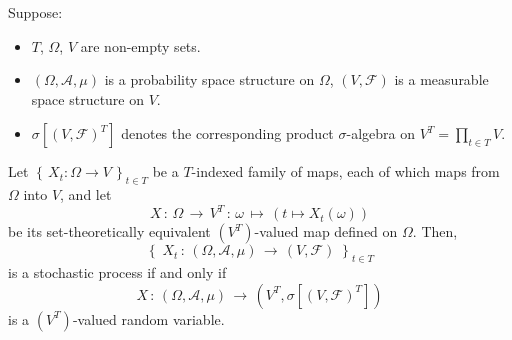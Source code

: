 \begin{corollary}
\mbox{}\vskip 0.1cm
\noindent
Suppose:
\begin{itemize}
\item	$T$, $\Omega$, $V$ are non-empty sets.
\item	$\left(\Omega,\mathcal{A},\mu\right)$ is a probability space structure on $\Omega$,
		$\left(V,\mathcal{F}\right)$ is a measurable space structure on $V$.
\item	$\sigma[(V,\mathcal{F})^{T}]$ denotes the corresponding product $\sigma$-algebra
		on $V^{T} = \prod_{t\in T}V$.
\end{itemize}
Let $\left\{\,X_{t} : \Omega \longrightarrow V \,\right\}_{t \in T}$
be a $T$-indexed family of maps, each of which maps from $\Omega$ into $V$,
and let
\begin{equation*}
X \,:\, \Omega \,\longrightarrow\, V^{T} \,:\, \omega \,\longmapsto\, \left(t \longmapsto X_{t}(\omega)\right)
\end{equation*}
be its set-theoretically equivalent $(V^{T})$-valued map defined on $\Omega$.
Then,
\begin{equation*}
\left\{\; X_{t} \,:\, \left(\Omega,\mathcal{A},\mu\right)\,\longrightarrow\,\left(V,\mathcal{F}\right) \;\right\}_{t \in T}
\end{equation*}
is a stochastic process if and only if
\begin{equation*}
X \,:\, \left(\Omega,\mathcal{A},\mu\right)\,\longrightarrow\,\left(V^{T},\sigma[(V,\mathcal{F})^{T}]\right)
\end{equation*}
is a $(V^{T})$-valued random variable.
\end{corollary}

